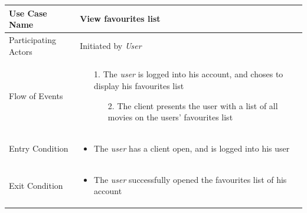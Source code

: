 \begin{center}
	\begin{tabular}{ | l | p{10cm} |  }
		 \hline
		Use Case Name & View favourites list \\ \hline
		Participating Actors & Initiated by \emph{User} \\ \hline
		Flow of Events & \begin{enumerate}
						\item[1.] The \emph{user} is logged into his account, and choses to display his favourites list
						\begin{enumerate}
							\item[2.] The client presents the user with a list of all movies on the users' favourites list
						\end{enumerate}
					\end{enumerate} \\ \hline
		Entry Condition & \begin{itemize}
						\item The \emph{user} has a client open, and is logged into his user
					\end{itemize} \\ \hline
		Exit Condition & \begin{itemize}
						\item The \emph{user} successfully opened the favourites list of his account
					\end{itemize} \\
		\hline
	\end{tabular}
\end{center}

